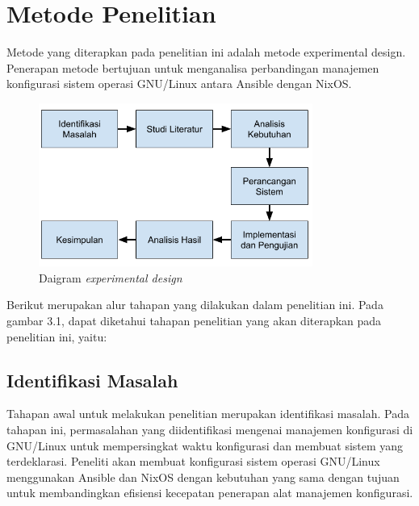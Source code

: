 \documentclass[10pt,]{report}
\begin{document}
\section{Metode Penelitian}
\begin{adjustwidth}{20pt}{}
	\vspace{-3mm}
	\hspace\parindent
	Metode yang diterapkan pada penelitian ini adalah metode experimental design.
	Penerapan metode bertujuan untuk menganalisa perbandingan manajemen
	konfigurasi sistem operasi GNU/Linux antara Ansible dengan NixOS.

	\begin{figure}[h]
		\centering
		\includegraphics[width=0.8\textwidth]{images/metpen.png}
		\caption{Daigram \textit{experimental design}}
	\end{figure}

\end{adjustwidth}
\begin{adjustwidth}{20pt}{}
	\hspace\parindent
	Berikut merupakan alur tahapan yang dilakukan dalam penelitian ini.
	Pada gambar 3.1, dapat diketahui tahapan penelitian yang akan diterapkan
	pada penelitian ini, yaitu:
\end{adjustwidth}
\begin{adjustwidth}{20pt}{}
	\subsection{Identifikasi Masalah}
	\vspace{-3mm}
	\begin{adjustwidth}{20pt}{}
		Tahapan awal untuk melakukan penelitian merupakan identifikasi masalah. Pada
		tahapan ini, permasalahan yang diidentifikasi mengenai manajemen konfigurasi
		di GNU/Linux untuk mempersingkat waktu konfigurasi dan membuat sistem yang
		terdeklarasi. Peneliti akan membuat konfigurasi sistem operasi GNU/Linux
		menggunakan Ansible dan NixOS dengan kebutuhan yang sama dengan tujuan untuk
		membandingkan efisiensi kecepatan penerapan alat manajemen konfigurasi.
	\end{adjustwidth}
\end{adjustwidth}
\end{document}
